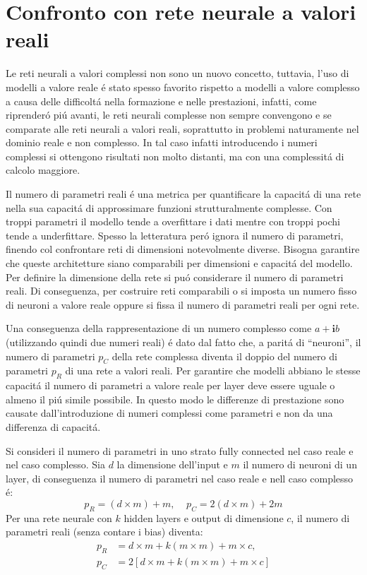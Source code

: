 \documentclass[a4paper,12pt]{report}
\begin{document}
 \section{Confronto con rete neurale a valori reali} \label{CompR-Csection}
 
 Le reti neurali a valori complessi non sono un nuovo concetto, tuttavia, l'uso di modelli a valore reale \'e stato spesso favorito rispetto a modelli a valore complesso a causa delle difficolt\'a nella formazione e nelle prestazioni, infatti, come riprender\'o pi\'u avanti, le reti neurali complesse non sempre convengono e se comparate alle reti neurali a valori reali, soprattutto in problemi naturamente nel dominio reale e non complesso. 
 In tal caso infatti introducendo i numeri complessi si ottengono risultati non molto distanti, ma con una complessit\'a di calcolo maggiore. 
 
 Il numero di parametri reali \'e una metrica per quantificare la capacit\'a di una rete nella sua capacit\'a di approssimare funzioni strutturalmente complesse. 
 Con troppi parametri il modello tende a overfittare i dati mentre con troppi pochi tende a underfittare. Spesso la letteratura per\'o ignora il numero di parametri, finendo col confrontare reti di dimensioni notevolmente diverse.  Bisogna garantire che queste architetture siano comparabili per dimensioni e capacit\'a del modello. 
 Per definire la dimensione della rete si pu\'o considerare il numero di parametri reali. Di conseguenza, per costruire reti comparabili o si imposta un numero fisso di neuroni a valore reale oppure si fissa il numero di parametri reali per ogni rete.
 
 Una conseguenza della rappresentazione di un numero complesso come $a+\textbf{i}b$ (utilizzando quindi due numeri reali) \'e dato dal fatto che, a parit\'a di ``neuroni'', il numero di parametri $p_C$ della rete complessa diventa il doppio del numero di parametri $p_R$ di una rete a valori reali. 
 Per garantire che  modelli abbiano le stesse capacit\'a il numero di parametri a valore reale per layer deve essere uguale o almeno il pi\'u simile possibile. 
 In questo modo le differenze di prestazione sono causate dall'introduzione di numeri complessi come parametri e non da una differenza di capacit\'a. 
 
 Si consideri il numero di parametri in uno strato fully connected nel caso reale e nel caso complesso. 
 Sia $d$ la dimensione dell'input e $m$ il numero di neuroni di un layer, di conseguenza il numero di parametri nel caso reale e nell caso complesso \'e:
 \begin{equation}
  p_R = (d \times m) + m, \;\;\;\; p_C = 2(d \times m) + 2m
 \end{equation}
 Per una rete neurale con $k$ hidden layers e output di dimensione $c$, il numero di parametri reali (senza contare i bias) diventa:
 \begin{align}
  p_R &= d \times m + k(m \times m) + m \times c, \\
  p_C &= 2\left[ d \times m + k(m \times m) + m \times c \right]
 \end{align}
 
\end{document}
